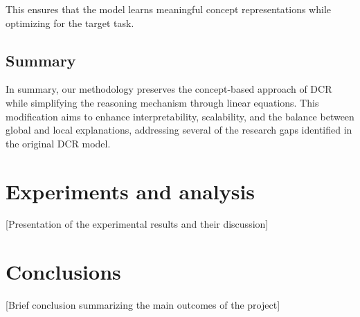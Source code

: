 \documentclass[sigconf, nonacm]{acmart}
\begin{document}
This ensures that the model learns meaningful concept representations while optimizing for the target task.

\subsection{Summary}

In summary, our methodology preserves the concept-based approach of DCR while simplifying the reasoning mechanism through linear equations. This modification aims to enhance interpretability, scalability, and the balance between global and local explanations, addressing several of the research gaps identified in the original DCR model.

\section{Experiments and analysis}
[Presentation of the experimental results and their discussion]



\section{Conclusions}
[Brief conclusion summarizing the main outcomes of the project]




\end{document}
